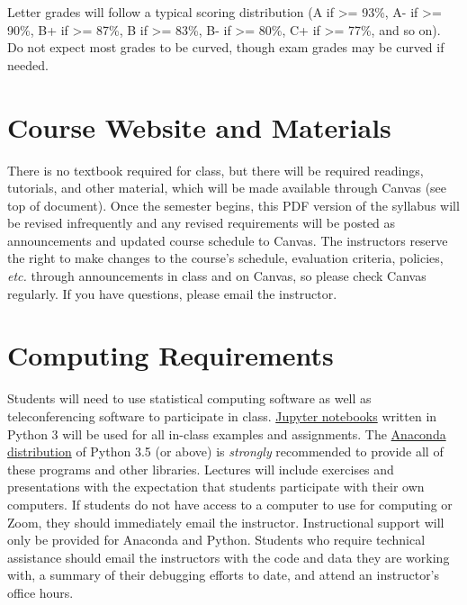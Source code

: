 \documentclass[10pt]{memoir}
\begin{document}
Letter grades will follow a typical scoring distribution (A if >= 93\%, A- if >= 90\%, B+ if >=
87\%, B if >= 83\%, B- if >= 80\%, C+ if >= 77\%, and so on). Do not expect most grades to be
curved, though exam grades may be curved if needed.


\section{\textbf{Course Website and Materials}}
There is no textbook required for class, but there will be required readings, tutorials, and other material, which will be made available through Canvas (see top of document). Once the semester begins, this PDF version of the syllabus will be revised infrequently and any revised requirements will be posted as announcements and updated course schedule to Canvas. The instructors reserve the right to make changes to the course's schedule, evaluation criteria, policies, \textit{etc.} through announcements in class and on Canvas, so please check Canvas regularly. If you have questions, please email the instructor.

\section{\textbf{Computing Requirements}}
Students will need to use statistical computing software as well as teleconferencing software to participate in class. \href{http://jupyter.org/}{Jupyter notebooks} written in Python 3 will be used for all in-class examples and assignments. The \href{https://www.continuum.io/why-anaconda}{Anaconda distribution} of Python 3.5 (or above) is \textit{strongly} recommended to provide all of these programs and other libraries. Lectures will include exercises and presentations with the expectation that students participate with their own computers. If students do not have access to a computer to use for computing or Zoom, they should immediately email the instructor. Instructional support will only be provided for Anaconda and Python. Students who require technical assistance should email the instructors with the code and data they are working with, a summary of their debugging efforts to date, and attend an instructor's office hours.
\end{document}
